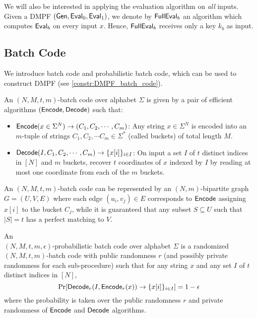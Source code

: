  We will also be interested in applying the evaluation algorithm on \emph{all} inputs. Given a DMPF $({\sf Gen},{\sf Eval}_0,{\sf Eval}_1)$, we denote by ${\sf FullEval}_b$ an algorithm which computes ${\sf Eval}_b$ on every input $x$. Hence, ${\sf FullEval}_b$ receives only a key $k_b$ as input.



\subsection{Batch Code}
We introduce batch code and probabilistic batch code, which can be used to construct DMPF (see \cref{constr:DMPF_batch_code}). 
\begin{definition}
  An $(N,M,t,m)$-batch code over alphabet $\Sigma$ is given by a pair of efficient algorithms $({\sf Encode},{\sf Decode})$ such that:
  \begin{itemize}
    \item ${\sf Encode}(x\in\Sigma^N)\rightarrow (C_1,C_2,\cdots,C_m)$: Any string $x\in\Sigma^N$ is encoded into an $m$-tuple of strings $C_1,C_2,\cdots C_m\in\Sigma^*$ (called buckets) of total length $M$.
    \item ${\sf Decode}(I,C_1,C_2,\cdots,C_m)\rightarrow \{x[i]\}_{i\in I}$: On input a set $I$ of $t$ distinct indices in $[N]$ and $m$ buckets, recover $t$ coordinates of $x$ indexed by $I$ by reading at most one coordinate from each of the $m$ buckets. 
  \end{itemize}
\end{definition}

An $(N,M,t,m)$-batch code can be represented by an $(N,m)$-bipartite graph $G=(U,V,E)$ where each edge $(u_i,v_j)\in E$ corresponds to ${\sf Encode}$ assigning $x[i]$ to the bucket $C_j$, while it is guaranteed that any subset $S\subseteq U$ such that $|S|=t$ has a perfect matching to $V$. 

\begin{definition}
An\\ $(N,M,t,m,\epsilon)$-probabilistic batch code over alphabet $\Sigma$ is a randomized $(N,M,t,m)$-batch code with public randomness $r$ (and possibly private randomness for each sub-procedure) such that for any string $x$ and any set $I$ of $t$ distinct indices in $[N]$, 
\[
  \Pr[{\sf Decode}_r(I,{\sf Encode}_r(x))\rightarrow \{x[i]\}_{i\in I}] = 1-\epsilon
\]
where the probability is taken over the public randomness $r$ and private randomness of ${\sf Encode}$ and ${\sf Decode}$ algorithms. 
\end{definition}

